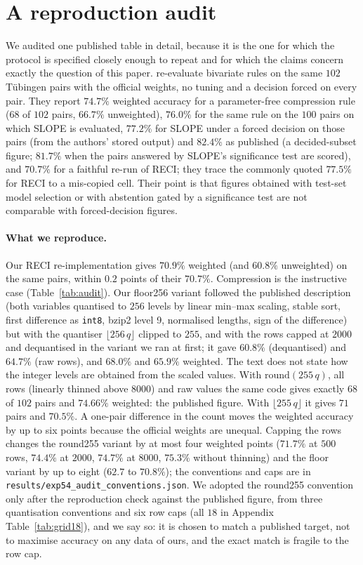 \section{A reproduction audit}\label{sec:audit}

We audited one published table in detail, because it is the one for which the protocol is specified closely enough to repeat and for which the claims concern exactly the question of this paper. \citet{stienstra2026oneruler} re-evaluate bivariate rules on the same $102$ T\"ubingen pairs with the official weights, no tuning and a decision forced on every pair. They report $74.7\%$ weighted accuracy for a parameter-free compression rule ($68$ of $102$ pairs, $66.7\%$ unweighted), $76.0\%$ for the same rule on the $100$ pairs on which SLOPE \citep{marx2017slope} is evaluated, $77.2\%$ for SLOPE under a forced decision on those pairs (from the authors' stored output) and $82.4\%$ as published (a decided-subset figure; $81.7\%$ when the pairs answered by SLOPE's significance test are scored), and $70.7\%$ for a faithful re-run of RECI; they trace the commonly quoted $77.5\%$ for RECI to a mis-copied cell. Their point is that figures obtained with test-set model selection or with abstention gated by a significance test are not comparable with forced-decision figures.

\paragraph{What we reproduce.} Our RECI re-implementation gives $70.9\%$ weighted (and $60.8\%$ unweighted) on the same pairs, within $0.2$ points of their $70.7\%$. Compression is the instructive case (Table~\ref{tab:audit}). Our floor256 variant followed the published description (both variables quantised to $256$ levels by linear min--max scaling, stable sort, first difference as \texttt{int8}, bzip2 level 9, normalised lengths, sign of the difference) but with the quantiser $\lfloor 256\,q\rfloor$ clipped to $255$, and with the rows capped at $2000$ and dequantised in the variant we ran at first; it gave $60.8\%$ (dequantised) and $64.7\%$ (raw rows), and $68.0\%$ and $65.9\%$ weighted. The text does not state how the integer levels are obtained from the scaled values. With $\mathrm{round}(255\,q)$, all rows (linearly thinned above $8000$) and raw values the same code gives exactly $68$ of $102$ pairs and $74.66\%$ weighted: the published figure. With $\lfloor 255\,q\rfloor$ it gives $71$ pairs and $70.5\%$. A one-pair difference in the count moves the weighted accuracy by up to six points because the official weights are unequal. Capping the rows changes the round255 variant by at most four weighted points ($71.7\%$ at $500$ rows, $74.4\%$ at $2000$, $74.7\%$ at $8000$, $75.3\%$ without thinning) and the floor variant by up to eight ($62.7$ to $70.8\%$); the conventions and caps are in \texttt{results/exp54\_audit\_conventions.json}. We adopted the round255 convention only after the reproduction check against the published figure, from three quantisation conventions and six row caps (all $18$ in Appendix Table~\ref{tab:grid18}), and we say so: it is chosen to match a published target, not to maximise accuracy on any data of ours, and the exact match is fragile to the row cap.

